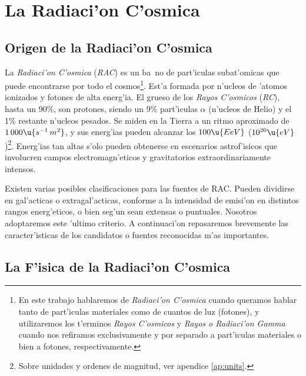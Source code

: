 
\chapter{La Radiaci'on C'osmica}
\label{chapter:cosmicrad}
\let\rightmark\leftmark

\section{Origen de la Radiaci'on C'osmica}

La {\sl Radiaci'on C'osmica} ({\sl RAC}) es un ba~no de part'iculas
subat'omicas que puede encontrarse por todo el cosmos\footnote{En este
  trabajo hablaremos de {\sl Radiaci'on C'osmica} cuando queramos
  hablar tanto de part'iculas materiales como de cuantos de luz
  (fotones), y utilizaremos los t'erminos \emph{Rayos C'osmicos} y
  \emph{Rayos {\rm o} Radiaci'on Gamma} cuando nos refiramos
  exclusivamente y por separado a part'iculas materiales o bien a
  fotones, respectivamente.}.  Est'a formada por n'ucleos de 'atomos
ionizados y fotones de alta energ'ia. El grueso de los \emph{Rayos
  C'osmicos} ({\sl RC}), hasta un 90\%, son protones, siendo un 9\%
part'iculas $\alpha$ (n'ucleos de Helio) y el 1\% restante n'ucleos
pesados. Se miden en la Tierra a un ritmo aproximado de
$1\,000\u{s^{-1}\,m^{2}}$, y sus energ'ias pueden alcanzar los
$100\u{EeV}$ ($10^{20}\u{eV}$)\footnote{Sobre unidades y ordenes de
  magnitud, ver apendice \ref{ap:units}.}. Energ'ias tan altas s'olo
pueden obtenerse en escenarios astrof'isicos que involucren campos
electromagn'eticos y gravitatorios extraordinariamente intensos.

Existen varias posibles clasificaciones para las fuentes de RAC.
Pueden dividirse en gal'acticas o extragal'acticas, conforme a la
intensidad de emisi'on en distintos rangos energ'eticos, o bien seg'un
sean extensas o puntuales. Nosotros adoptaremos este 'ultimo criterio.
A continuaci'on repasaremos brevemente las caracter'isticas de los
candidatos o fuentes reconocidas m'as importantes.

\section{La F'isica de la Radiaci'on C'osmica}

